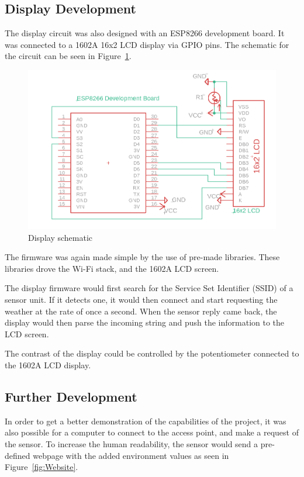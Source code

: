 \documentclass[onecolumn, 12pt]{IEEEConf}
\begin{document}
    \subsection{Display Development}
        The display circuit was also designed with an ESP8266 development board.
        It was connected to a 1602A 16x2 LCD display via GPIO pins.
        The schematic for the circuit can be seen in Figure~\ref{fig:ClientSchematic}.
        
        \begin{figure}
            \centering
            \includegraphics[max width=\textwidth,keepaspectratio,scale=.6]{images/ClientSchematic.png}
            \caption{\label{fig:ClientSchematic}Display schematic}
        \end{figure}

        The firmware was again made simple by the use of pre-made libraries.
        These libraries drove the Wi-Fi stack, and the 1602A LCD screen.

        The display firmware would first search for the Service Set Identifier (SSID) of a sensor unit.
        If it detects one, it would then connect and start requesting the weather at the rate of once a second.
        When the sensor reply came back, the display would then parse the incoming string and push the information to the LCD screen.

        The contrast of the display could be controlled by the potentiometer connected to the 1602A LCD display.

    \subsection{Further Development}
        In order to get a better demonstration of the capabilities of the project, 
        it was also possible for a computer to connect to the access point, and make a request of the sensor.
        To increase the human readability, the sensor would send a pre-defined webpage with the added environment values
        as seen in Figure~\ref{fig:Website}.
\end{document}
